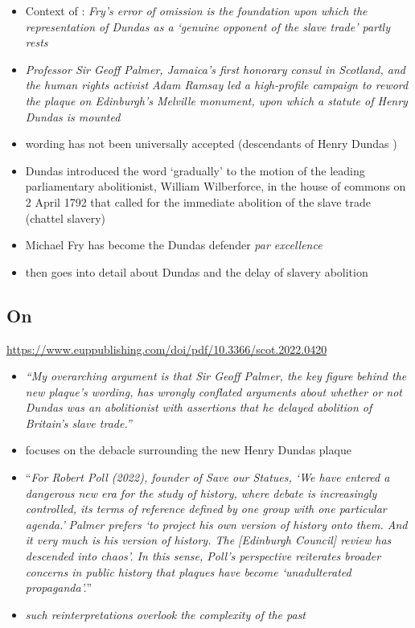 \documentclass{scrartcl}
\begin{document}
\begin{itemize}
    \item Context of \cite{fry_1992}: \textit{Fry’s error of omission is the foundation upon which the representation of Dundas as a ‘genuine opponent of the slave trade’ partly rests}
    \item \textit{Professor Sir Geoff Palmer, Jamaica’s first honorary consul in Scotland, and the human rights activist Adam Ramsay led a high-profile campaign to reword the plaque on Edinburgh’s Melville monument, upon which a statute of Henry Dundas is mounted}
    \item wording has not been universally accepted (descendants of Henry Dundas )
    \item Dundas introduced the word ‘gradually’ to the motion of the leading parliamentary abolitionist, William Wilberforce, in the house of commons on 2 April 1792 that called for the immediate abolition of the slave trade (chattel slavery)
    \item Michael Fry has become the Dundas defender \textit{par excellence}
    \item then goes into detail about Dundas and the delay of slavery abolition

\end{itemize}


\subsection{On \cite{mccarthy_2022}}

\url{https://www.euppublishing.com/doi/pdf/10.3366/scot.2022.0420}

\begin{itemize}
    \item \textit{``My overarching argument is that Sir Geoff Palmer, the key figure behind the new plaque’s wording, has wrongly conflated arguments about whether or not Dundas was an abolitionist with assertions that he delayed abolition of Britain’s slave trade.''}
    \item focuses on the debacle surrounding the new Henry Dundas plaque
    \item ``\textit{For Robert Poll (2022), founder of Save our Statues, ‘We have entered a dangerous new era for the study of history, where debate is increasingly controlled, its terms of reference defined by one group with one particular agenda.’ }\textit{Palmer prefers ‘to project his own version of history onto them. And it very much is his version of history. The [Edinburgh Council] review has descended into chaos’. In this sense, Poll’s perspective reiterates broader concerns in public history that plaques have become ‘unadulterated propaganda’.}''
    \item \textit{such reinterpretations overlook the complexity of the past}
\end{itemize}
\end{document}

